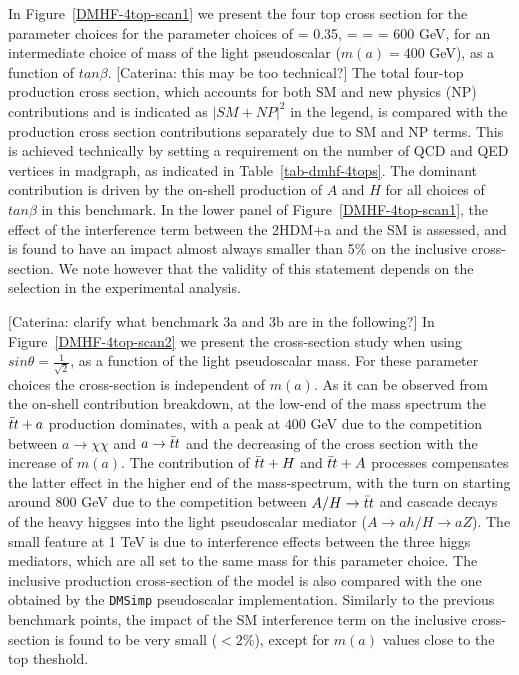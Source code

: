 In Figure~\ref{DMHF-4top-scan1} we present the four top cross section
for the parameter choices for the parameter choices
of \sinp = 0.35, \mA = \mH = \mHc = 600 GeV, for an intermediate choice
of mass of the light pseudoscalar ($m(a) = 400$ GeV), as a function of
$tan\beta$. 
\color{red}[Caterina: this may be too technical?]\color{black}
The total four-top production cross section, which
accounts for both SM and new physics (NP) contributions and is indicated
as $|SM+NP|^2$ in the legend, is compared with the production cross
section contributions separately due to SM and NP terms. 
This is achieved technically by setting a requirement on the number of
QCD and QED vertices in madgraph, as indicated in Table~\ref{tab-dmhf-4tops}.
The dominant contribution is
driven by the on-shell production of $A$ and $H$ for all choices of
$tan\beta$ in this benchmark. 
In the lower panel of Figure~\ref{DMHF-4top-scan1}, the effect of the
interference term between the 2HDM+a and the SM is assessed, and is
found to have an impact almost always smaller than 5\% on the
inclusive cross-section. 
We note however that the validity of this statement depends
on the selection in the experimental analysis. 

\color{red}[Caterina: clarify what benchmark 3a and 3b are in the following?]\color{black}
In Figure~\ref{DMHF-4top-scan2} we present the cross-section
study when using $sin\theta = \frac{1}{\sqrt{2}}$, as a function of the light
pseudoscalar mass. 
For these parameter choices the cross-section is
independent of $m(a)$. As it can
be observed from the on-shell contribution breakdown, at the
low-end of the mass spectrum the $\bar{t}t+a$ production dominates, with a
peak at $400$ GeV due to the competition between
$a\rightarrow \chi\chi$ and $a\rightarrow \bar{t}t$ and the 
decreasing of the cross section with the increase of $m(a)$.  The contribution of
$\bar{t}t+H$ and $\bar{t}t+A$ processes compensates the latter effect in
the higher end of the mass-spectrum, with the turn on starting around
$800$ GeV due to the competition between $A/H\rightarrow\bar{t}t$ and
cascade decays of the heavy higgses into the light pseudoscalar
mediator ($A\rightarrow ah/H\rightarrow aZ$). 
The small feature at 1 TeV is due to interference effects between the
three higgs mediators, which are all set to the
same mass for this parameter choice.  
The inclusive production cross-section of the \hdma
model is also compared with the one obtained by the \texttt{DMSimp} pseudoscalar
implementation. 
Similarly to the previous benchmark points, the impact of the SM interference term on the inclusive cross-section is found to be very small ($<2\%$), except for $m(a)$ values close to the top theshold. 

